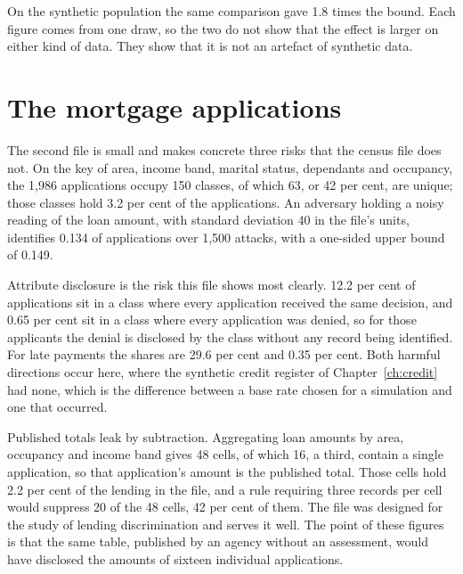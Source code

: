 On the synthetic population the same comparison gave 1.8 times the bound. Each figure
comes from one draw, so the two do not show that the effect is larger on either kind of
data. They show that it is not an artefact of synthetic data.

\section{The mortgage applications}

The second file is small and makes concrete three risks that the census file does not.
On the key of area, income band, marital status, dependants and occupancy, the 1,986
applications occupy 150 classes, of which 63, or 42 per cent, are unique; those classes
hold 3.2 per cent of the applications. An adversary holding a noisy reading of the loan
amount, with standard deviation 40 in the file's units, identifies 0.134 of applications
over 1,500 attacks, with a one-sided upper bound of 0.149.

Attribute disclosure is the risk this file shows most clearly. 12.2 per cent of
applications sit in a class where every application received the same decision, and
0.65 per cent sit in a class where every application was denied, so for those applicants
the denial is disclosed by the class without any record being identified. For late
payments the shares are 29.6 per cent and 0.35 per cent.
Both harmful directions occur here, where the synthetic credit register of
Chapter~\ref{ch:credit} had none, which is the difference between a base rate chosen for
a simulation and one that occurred.

Published totals leak by subtraction. Aggregating loan amounts by area, occupancy and
income band gives 48 cells, of which 16, a third, contain a single application, so that
application's amount is the published total. Those cells hold 2.2 per cent of the
lending in the file, and a rule requiring three records per cell would suppress 20 of
the 48 cells, 42 per cent of them.
The file was designed for the study of lending discrimination and serves it well. The
point of these figures is that the same table, published by an agency without an
assessment, would have disclosed the amounts of sixteen individual applications.

